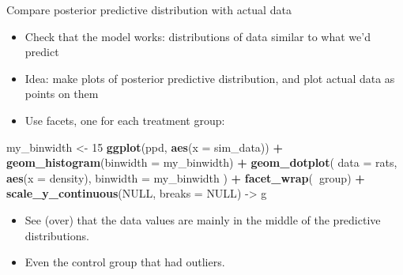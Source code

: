 \documentclass[
  ignorenonframetext,
]{beamer}
\newenvironment{Shaded}{\begin{snugshade}}{\end{snugshade}}
\newcommand{\DataTypeTok}[1]{\textcolor[rgb]{0.13,0.29,0.53}{#1}}
\newcommand{\DecValTok}[1]{\textcolor[rgb]{0.00,0.00,0.81}{#1}}
\newcommand{\KeywordTok}[1]{\textcolor[rgb]{0.13,0.29,0.53}{\textbf{#1}}}
\newcommand{\NormalTok}[1]{#1}
\newcommand{\OperatorTok}[1]{\textcolor[rgb]{0.81,0.36,0.00}{\textbf{#1}}}
\newcommand{\OtherTok}[1]{\textcolor[rgb]{0.56,0.35,0.01}{#1}}
\newcommand{\StringTok}[1]{\textcolor[rgb]{0.31,0.60,0.02}{#1}}
\providecommand{\tightlist}{%
  \setlength{\itemsep}{0pt}\setlength{\parskip}{0pt}}
\begin{document}
\begin{frame}[fragile]{Compare posterior predictive distribution with
actual data}
\protect\hypertarget{compare-posterior-predictive-distribution-with-actual-data}{}

\begin{itemize}
\tightlist
\item
  Check that the model works: distributions of data similar to what we'd
  predict
\item
  Idea: make plots of posterior predictive distribution, and plot actual
  data as points on them
\item
  Use facets, one for each treatment group:
\end{itemize}

\begin{Shaded}
\begin{Highlighting}[]
\NormalTok{my_binwidth <-}\StringTok{ }\DecValTok{15}
\KeywordTok{ggplot}\NormalTok{(ppd, }\KeywordTok{aes}\NormalTok{(}\DataTypeTok{x =}\NormalTok{ sim_data)) }\OperatorTok{+}
\StringTok{  }\KeywordTok{geom_histogram}\NormalTok{(}\DataTypeTok{binwidth =}\NormalTok{ my_binwidth) }\OperatorTok{+}
\StringTok{  }\KeywordTok{geom_dotplot}\NormalTok{(}
    \DataTypeTok{data =}\NormalTok{ rats, }\KeywordTok{aes}\NormalTok{(}\DataTypeTok{x =}\NormalTok{ density),}
    \DataTypeTok{binwidth =}\NormalTok{ my_binwidth}
\NormalTok{  ) }\OperatorTok{+}
\StringTok{  }\KeywordTok{facet_wrap}\NormalTok{(}\OperatorTok{~}\NormalTok{group) }\OperatorTok{+}
\StringTok{  }\KeywordTok{scale_y_continuous}\NormalTok{(}\OtherTok{NULL}\NormalTok{, }\DataTypeTok{breaks =} \OtherTok{NULL}\NormalTok{) ->}\StringTok{ }\NormalTok{g}
\end{Highlighting}
\end{Shaded}

\begin{itemize}
\tightlist
\item
  See (over) that the data values are mainly in the middle of the
  predictive distributions.
\item
  Even the control group that had outliers.
\end{itemize}

\end{frame}
\end{document}
